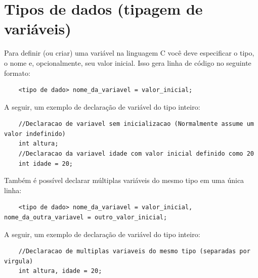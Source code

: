 \documentclass[12pt]{article}
\newcommand\tab[1][1cm]{\hspace*{#1}}
\begin{document}
\newpage

\section{Tipos de dados (tipagem de variáveis)}

\par\tab Para definir (ou criar) uma variável na linguagem C você deve especificar o tipo, o nome e, opcionalmente, seu valor inicial. Isso gera linha de código no seguinte formato:

\hspace{0.25cm}
\begin{lstlisting}
    <tipo de dado> nome_da_variavel = valor_inicial;
\end{lstlisting}

\hspace{0.25cm}
\par\tab A seguir, um exemplo de declaração de variável do tipo inteiro:

\hspace{0.25cm}
\begin{lstlisting}
    //Declaracao de variavel sem inicializacao (Normalmente assume um valor indefinido)
    int altura;
    //Declaracao da variavel idade com valor inicial definido como 20
    int idade = 20;
\end{lstlisting}

\hspace{0.25cm}
\par\tab Também é possível declarar múltiplas variáveis do mesmo tipo em uma única linha:

\hspace{0.25cm}
\begin{lstlisting}
    <tipo de dado> nome_da_variavel = valor_inicial, nome_da_outra_variavel = outro_valor_inicial;
\end{lstlisting}

\hspace{0.25cm}
\par\tab A seguir, um exemplo de declaração de variável do tipo inteiro:

\hspace{0.25cm}
\begin{lstlisting}
    //Declaracao de multiplas variaveis do mesmo tipo (separadas por virgula)
    int altura, idade = 20;
\end{lstlisting}
\end{document}
